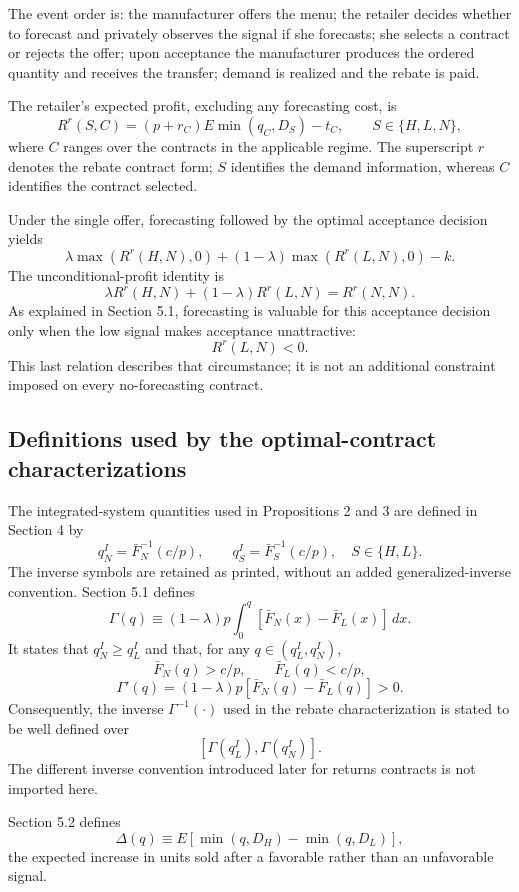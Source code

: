 \documentclass{article}
\begin{document}
The event order is: the manufacturer offers the menu; the retailer decides whether to forecast and privately observes the signal if she forecasts; she selects a contract or rejects the offer; upon acceptance the manufacturer produces the ordered quantity and receives the transfer; demand is realized and the rebate is paid.

The retailer's expected profit, excluding any forecasting cost, is
\[
R^r(S,C)=(p+r_C)E\min(q_C,D_S)-t_C,
\qquad S\in\{H,L,N\},
\]
where $C$ ranges over the contracts in the applicable regime. The superscript $r$ denotes the rebate contract form; $S$ identifies the demand information, whereas $C$ identifies the contract selected.

Under the single offer, forecasting followed by the optimal acceptance decision yields
\[
\lambda\max(R^r(H,N),0)
 +(1-\lambda)\max(R^r(L,N),0)-k.
\]
The unconditional-profit identity is
\[
\lambda R^r(H,N)+(1-\lambda)R^r(L,N)=R^r(N,N).
\]
As explained in Section 5.1, forecasting is valuable for this acceptance decision only when the low signal makes acceptance unattractive:
\[
R^r(L,N)<0.
\]
This last relation describes that circumstance; it is not an additional constraint imposed on every no-forecasting contract.

\subsection*{Definitions used by the optimal-contract characterizations}
The integrated-system quantities used in Propositions 2 and 3 are defined in Section 4 by
\[
q_N^I=\bar F_N^{-1}(c/p),\qquad
q_S^I=\bar F_S^{-1}(c/p),\quad S\in\{H,L\}.
\]
The inverse symbols are retained as printed, without an added generalized-inverse convention. Section 5.1 defines
\[
\Gamma(q)\equiv(1-\lambda)p\int_0^q
 [\bar F_N(x)-\bar F_L(x)]\,dx.
\]
It states that $q_N^I\geq q_L^I$ and that, for any $q\in(q_L^I,q_N^I)$,
\[
\bar F_N(q)>c/p,\qquad \bar F_L(q)<c/p,
\]
\[
\Gamma'(q)=(1-\lambda)p[\bar F_N(q)-\bar F_L(q)]>0.
\]
Consequently, the inverse $\Gamma^{-1}(\cdot)$ used in the rebate characterization is stated to be well defined over
\[
[\Gamma(q_L^I),\Gamma(q_N^I)].
\]
The different inverse convention introduced later for returns contracts is not imported here.

Section 5.2 defines
\[
\Delta(q)\equiv E[\min(q,D_H)-\min(q,D_L)],
\]
the expected increase in units sold after a favorable rather than an unfavorable signal.
\end{document}
